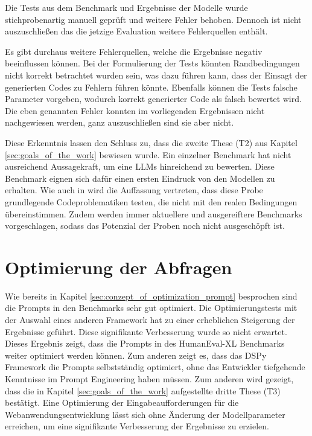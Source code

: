 Die Tests aus dem Benchmark und Ergebnisse der Modelle wurde stichprobenartig manuell geprüft und weitere Fehler behoben. Dennoch ist nicht auszuschließen das die jetzige Evaluation weitere Fehlerquellen enthält.\vspace{0.2cm}

Es gibt durchaus weitere Fehlerquellen, welche die Ergebnisse negativ beeinflussen können. Bei der Formulierung der Tests könnten Randbedingungen nicht korrekt betrachtet wurden sein, was dazu führen kann, dass der Einsagt der generierten Codes zu Fehlern führen könnte. Ebenfalls können die Tests falsche Parameter vorgeben, wodurch korrekt generierter Code als falsch bewertet wird. Die eben genannten Fehler konnten im vorliegenden Ergebnissen nicht nachgewiesen werden, ganz auszuschließen sind sie aber nicht.\vspace{0.2cm}

Diese Erkenntnis lassen den Schluss zu, dass die zweite These (T2) aus Kapitel \ref{sec:goals_of_the_work} bewiesen wurde. Ein einzelner Benchmark hat nicht ausreichend Aussagekraft, um eine LLMs hinreichend zu bewerten. Diese Benchmark eignen sich dafür einen ersten Eindruck von den Modellen zu erhalten. Wie auch in \cite{zhang-2024} wird die Auffassung vertreten, dass diese Probe grundlegende Codeproblematiken testen, die nicht mit den realen Bedingungen übereinstimmen. Zudem werden immer aktuellere und ausgereiftere Benchmarks vorgeschlagen, sodass das Potenzial der Proben noch nicht ausgeschöpft ist.\vspace{0.2cm}



\section{Optimierung der Abfragen}
Wie bereits in Kapitel \ref{sec:conzept_of_optimization_prompt} besprochen sind die Prompts in den Benchmarks sehr gut optimiert. Die Optimierungstests mit der Auswahl eines anderen Framework hat zu einer erheblichen Steigerung der Ergebnisse geführt. Diese signifikante Verbesserung wurde so nicht erwartet. Dieses Ergebnis zeigt, dass die Prompts in des HumanEval-XL Benchmarks weiter optimiert werden können. Zum anderen zeigt es, dass das DSPy Framework die Prompts selbstständig optimiert, ohne das Entwickler tiefgehende Kenntnisse im Prompt Engineering haben müssen. Zum anderen wird gezeigt, dass die in Kapitel \ref{sec:goals_of_the_work} aufgestellte dritte These (T3) bestätigt. Eine Optimierung der Eingabeaufforderungen für die Webanwendungsentwicklung lässt sich ohne Änderung der Modellparameter erreichen, um eine signifikante Verbesserung der Ergebnisse zu erzielen.\vspace{0.2cm}


